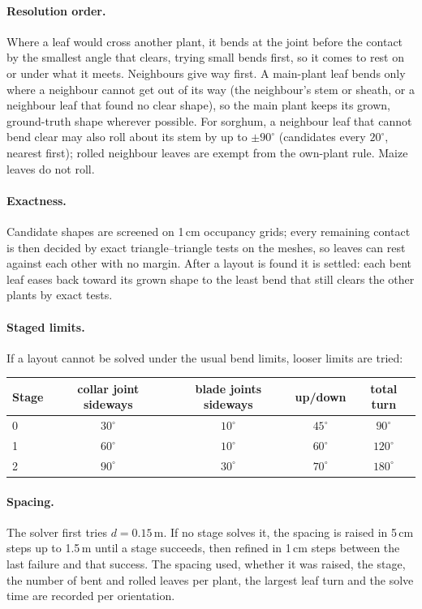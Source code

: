 \documentclass[11pt]{article}
\begin{document}
\paragraph{Resolution order.} Where a leaf would cross another plant, it bends at the joint before the contact by the
smallest angle that clears, trying small bends first, so it comes to rest on or under what it meets. Neighbours give way
first. A main-plant leaf bends only where a neighbour cannot get out of its way (the neighbour's stem or sheath, or a
neighbour leaf that found no clear shape), so the main plant keeps its grown, ground-truth shape wherever possible. For
sorghum, a neighbour leaf that cannot bend clear may also roll about its stem by up to $\pm90^\circ$ (candidates every
$20^\circ$, nearest first); rolled neighbour leaves are exempt from the own-plant rule. Maize leaves do not roll.

\paragraph{Exactness.} Candidate shapes are screened on 1\,cm occupancy grids; every remaining contact is then decided
by exact triangle--triangle tests on the meshes, so leaves can rest against each other with no margin. After a layout
is found it is settled: each bent leaf eases back toward its grown shape to the least bend that still clears the other
plants by exact tests.

\paragraph{Staged limits.} If a layout cannot be solved under the usual bend limits, looser limits are tried:

\begin{center}\small
\begin{tabular}{lcccc}
\toprule
Stage & collar joint sideways & blade joints sideways & up/down & total turn \\
\midrule
0 & $30^\circ$ & $10^\circ$ & $45^\circ$ & $90^\circ$ \\
1 & $60^\circ$ & $10^\circ$ & $60^\circ$ & $120^\circ$ \\
2 & $90^\circ$ & $30^\circ$ & $70^\circ$ & $180^\circ$ \\
\bottomrule
\end{tabular}
\end{center}

\paragraph{Spacing.} The solver first tries $d=0.15$\,m. If no stage solves it, the spacing is raised in 5\,cm steps up
to 1.5\,m until a stage succeeds, then refined in 1\,cm steps between the last failure and that success. The spacing
used, whether it was raised, the stage, the number of bent and rolled leaves per plant, the largest leaf turn and the
solve time are recorded per orientation.
\end{document}
